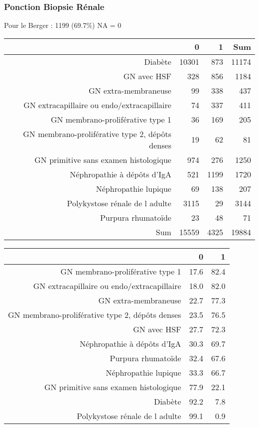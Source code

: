 \documentclass[11pt,a4paper]{article}\usepackage[]{graphicx}\usepackage[]{color}
\begin{document}
      \subsubsection{Ponction Biopsie Rénale}

Pour le Berger : 1199 (69.7\%) NA = 0

\begin{table}[H]
\centering
\begin{tabular}{rrrr}
  \hline
 & 0 & 1 & Sum \\ 
  \hline
Diabète & 10301 & 873 & 11174 \\ 
  GN avec HSF & 328 & 856 & 1184 \\ 
  GN extra-membraneuse & 99 & 338 & 437 \\ 
  GN extracapillaire ou endo/extracapillaire & 74 & 337 & 411 \\ 
  GN membrano-proliférative type 1 & 36 & 169 & 205 \\ 
  GN membrano-proliférative type 2, dépôts denses & 19 & 62 & 81 \\ 
  GN primitive sans examen histologique & 974 & 276 & 1250 \\ 
  Néphropathie à dépôts d'IgA & 521 & 1199 & 1720 \\ 
  Néphropathie lupique & 69 & 138 & 207 \\ 
  Polykystose rénale de l adulte & 3115 & 29 & 3144 \\ 
  Purpura rhumatoïde & 23 & 48 & 71 \\ 
  Sum & 15559 & 4325 & 19884 \\ 
   \hline
\end{tabular}
\end{table}
\begin{table}[H]
\centering
\begin{tabular}{rrr}
  \hline
 & 0 & 1 \\ 
  \hline
GN membrano-proliférative type 1 & 17.6 & 82.4 \\ 
  GN extracapillaire ou endo/extracapillaire & 18.0 & 82.0 \\ 
  GN extra-membraneuse & 22.7 & 77.3 \\ 
  GN membrano-proliférative type 2, dépôts denses & 23.5 & 76.5 \\ 
  GN avec HSF & 27.7 & 72.3 \\ 
  Néphropathie à dépôts d'IgA & 30.3 & 69.7 \\ 
  Purpura rhumatoïde & 32.4 & 67.6 \\ 
  Néphropathie lupique & 33.3 & 66.7 \\ 
  GN primitive sans examen histologique & 77.9 & 22.1 \\ 
  Diabète & 92.2 & 7.8 \\ 
  Polykystose rénale de l adulte & 99.1 & 0.9 \\ 
   \hline
\end{tabular}
\end{table}
\end{document}

